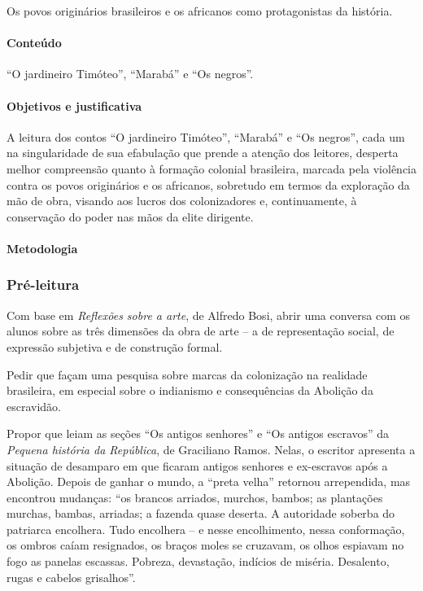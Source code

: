 \documentclass[12pt]{extarticle}
\begin{document}
Os povos originários brasileiros e os africanos como protagonistas da história.

\paragraph{Conteúdo} ``O jardineiro Timóteo'', ``Marabá'' e ``Os negros''.

\paragraph{Objetivos e justificativa}
A leitura dos contos ``O jardineiro Timóteo'', ``Marabá'' e ``Os
negros'', cada um na singularidade de sua efabulação que prende a
atenção dos leitores, desperta melhor compreensão quanto à formação
colonial brasileira, marcada pela violência contra os povos originários
e os africanos, sobretudo em termos da exploração da mão de obra,
visando aos lucros dos colonizadores e, continuamente, à conservação do
poder nas mãos da elite dirigente.

\paragraph{Metodologia}

\subsubsection{Pré-leitura}

Com base em \emph{Reflexões sobre a arte}, de Alfredo Bosi, abrir uma
conversa com os alunos sobre as três dimensões da obra de arte -- a de
representação social, de expressão subjetiva e de construção formal.

Pedir que façam uma pesquisa sobre marcas da colonização na realidade
brasileira, em especial sobre o indianismo e consequências da Abolição
da escravidão.

Propor que leiam as seções ``Os antigos senhores'' e ``Os antigos
escravos'' da \emph{Pequena história da República}, de Graciliano Ramos.
Nelas, o escritor apresenta a situação de desamparo em que ficaram
antigos senhores e ex-escravos após a Abolição. Depois de ganhar o
mundo, a ``preta velha'' retornou arrependida, mas encontrou mudanças:
``os brancos arriados, murchos, bambos; as plantações murchas, bambas,
arriadas; a fazenda quase deserta. A autoridade soberba do patriarca
encolhera. Tudo encolhera -- e nesse encolhimento, nessa conformação, os
ombros caíam resignados, os braços moles se cruzavam, os olhos espiavam
no fogo as panelas escassas. Pobreza, devastação, indícios de miséria.
Desalento, rugas e cabelos grisalhos''.
\end{document}
